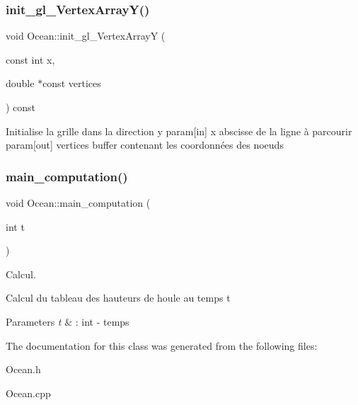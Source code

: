 \subsubsection{\texorpdfstring{init\+\_\+gl\+\_\+\+Vertex\+Array\+Y()}{init\_gl\_VertexArrayY()}}
{\footnotesize\ttfamily void Ocean\+::init\+\_\+gl\+\_\+\+Vertex\+ArrayY (\begin{DoxyParamCaption}\item[{const int}]{x,  }\item[{double $\ast$const}]{vertices }\end{DoxyParamCaption}) const}

Initialise la grille dans la direction y param\mbox{[}in\mbox{]} x abscisse de la ligne à parcourir param\mbox{[}out\mbox{]} vertices buffer contenant les coordonnées des noeuds \hypertarget{class_ocean_ae2b45ea776fbb72552af532b2cd8b120}{}\label{class_ocean_ae2b45ea776fbb72552af532b2cd8b120} 
\subsubsection{\texorpdfstring{main\+\_\+computation()}{main\_computation()}}
{\footnotesize\ttfamily void Ocean\+::main\+\_\+computation (\begin{DoxyParamCaption}\item[{int}]{t }\end{DoxyParamCaption})}



Calcul. 

Calcul du tableau des hauteurs de houle au temps t


\begin{DoxyParams}{Parameters}
{\em t} & \+: int -\/ temps \\
\hline
\end{DoxyParams}


The documentation for this class was generated from the following files\+:\begin{DoxyCompactItemize}
\item 
Ocean.\+h\item 
Ocean.\+cpp\end{DoxyCompactItemize}
